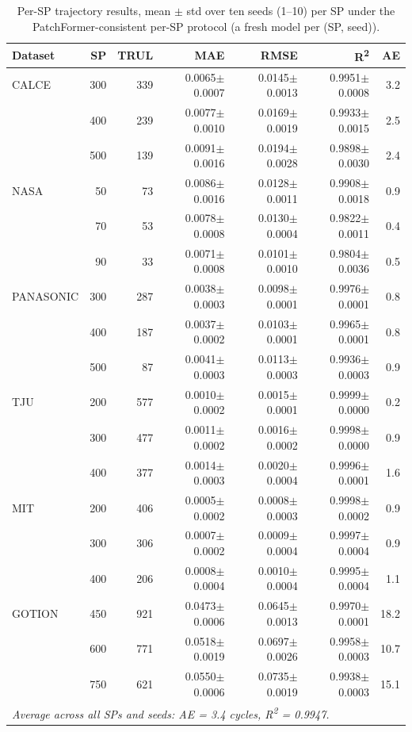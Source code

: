 \documentclass[final,5p,times,twocolumn]{elsarticle}
\begin{document}
\begin{table}[htbp]
\centering
\caption{Per-SP trajectory results, mean $\pm$ std
over ten seeds (1--10) per SP under the PatchFormer-consistent
per-SP protocol (a fresh model per (SP, seed)).}
\label{tab:tableA}
\scriptsize
\setlength{\tabcolsep}{1pt}
\begin{tabular}{lr rrrrr}
\toprule
Dataset & SP & TRUL & MAE & RMSE & R\textsuperscript{2} & AE \\
\midrule
CALCE & 300 & 339 & 0.0065$\pm$0.0007 & 0.0145$\pm$0.0013 & 0.9951$\pm$0.0008 & 3.2 \\
  & 400 & 239 & 0.0077$\pm$0.0010 & 0.0169$\pm$0.0019 & 0.9933$\pm$0.0015 & 2.5 \\
  & 500 & 139 & 0.0091$\pm$0.0016 & 0.0194$\pm$0.0028 & 0.9898$\pm$0.0030 & 2.4 \\
NASA & 50 & 73 & 0.0086$\pm$0.0016 & 0.0128$\pm$0.0011 & 0.9908$\pm$0.0018 & 0.9 \\
  & 70 & 53 & 0.0078$\pm$0.0008 & 0.0130$\pm$0.0004 & 0.9822$\pm$0.0011 & 0.4 \\
  & 90 & 33 & 0.0071$\pm$0.0008 & 0.0101$\pm$0.0010 & 0.9804$\pm$0.0036 & 0.5 \\
PANASONIC & 300 & 287 & 0.0038$\pm$0.0003 & 0.0098$\pm$0.0001 & 0.9976$\pm$0.0001 & 0.8 \\
  & 400 & 187 & 0.0037$\pm$0.0002 & 0.0103$\pm$0.0001 & 0.9965$\pm$0.0001 & 0.8 \\
  & 500 & 87 & 0.0041$\pm$0.0003 & 0.0113$\pm$0.0003 & 0.9936$\pm$0.0003 & 0.9 \\
TJU & 200 & 577 & 0.0010$\pm$0.0002 & 0.0015$\pm$0.0001 & 0.9999$\pm$0.0000 & 0.2 \\
  & 300 & 477 & 0.0011$\pm$0.0002 & 0.0016$\pm$0.0002 & 0.9998$\pm$0.0000 & 0.9 \\
  & 400 & 377 & 0.0014$\pm$0.0003 & 0.0020$\pm$0.0004 & 0.9996$\pm$0.0001 & 1.6 \\
MIT & 200 & 406 & 0.0005$\pm$0.0002 & 0.0008$\pm$0.0003 & 0.9998$\pm$0.0002 & 0.9 \\
  & 300 & 306 & 0.0007$\pm$0.0002 & 0.0009$\pm$0.0004 & 0.9997$\pm$0.0004 & 0.9 \\
  & 400 & 206 & 0.0008$\pm$0.0004 & 0.0010$\pm$0.0004 & 0.9995$\pm$0.0004 & 1.1 \\
GOTION & 450 & 921 & 0.0473$\pm$0.0006 & 0.0645$\pm$0.0013 & 0.9970$\pm$0.0001 & 18.2 \\
  & 600 & 771 & 0.0518$\pm$0.0019 & 0.0697$\pm$0.0026 & 0.9958$\pm$0.0003 & 10.7 \\
  & 750 & 621 & 0.0550$\pm$0.0006 & 0.0735$\pm$0.0019 & 0.9938$\pm$0.0003 & 15.1 \\
\midrule
\multicolumn{7}{l}{\emph{Average across all SPs and seeds: AE = 3.4 cycles, R\textsuperscript{2} = 0.9947.}} \\
\bottomrule
\end{tabular}
\end{table}
\end{document}
